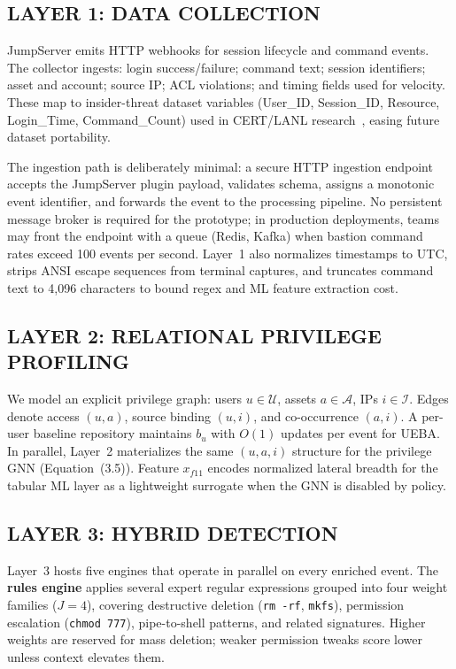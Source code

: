 \documentclass{ieeeaccess}
\begin{document}
\subsection{LAYER 1: DATA COLLECTION}
JumpServer emits HTTP webhooks for session lifecycle and command events. The collector ingests: login success/failure; command text; session identifiers; asset and account; source IP; ACL violations; and timing fields used for velocity. These map to insider-threat dataset variables (User\_ID, Session\_ID, Resource, Login\_Time, Command\_Count) used in CERT/LANL research~\cite{ref10}, easing future dataset portability.

The ingestion path is deliberately minimal: a secure HTTP ingestion endpoint accepts the JumpServer plugin payload, validates schema, assigns a monotonic event identifier, and forwards the event to the processing pipeline. No persistent message broker is required for the prototype; in production deployments, teams may front the endpoint with a queue (Redis, Kafka) when bastion command rates exceed 100 events per second. Layer~1 also normalizes timestamps to UTC, strips ANSI escape sequences from terminal captures, and truncates command text to 4{,}096 characters to bound regex and ML feature extraction cost.

\subsection{LAYER 2: RELATIONAL PRIVILEGE PROFILING}
We model an explicit privilege graph: users $u\in\mathcal{U}$, assets $a\in\mathcal{A}$, IPs $i\in\mathcal{I}$. Edges denote access $(u,a)$, source binding $(u,i)$, and co-occurrence $(a,i)$. A per-user baseline repository maintains $b_u$ with $O(1)$ updates per event for UEBA. In parallel, Layer~2 materializes the same $(u,a,i)$ structure for the privilege GNN (Equation~(3.5)). Feature $x_{f11}$ encodes normalized lateral breadth for the tabular ML layer as a lightweight surrogate when the GNN is disabled by policy.

\subsection{LAYER 3: HYBRID DETECTION}
Layer~3 hosts five engines that operate in parallel on every enriched event. The \textbf{rules engine} applies several expert regular expressions grouped into four weight families ($J=4$), covering destructive deletion (\texttt{rm -rf}, \texttt{mkfs}), permission escalation (\texttt{chmod 777}), pipe-to-shell patterns, and related signatures. Higher weights are reserved for mass deletion; weaker permission tweaks score lower unless context elevates them.
\end{document}
